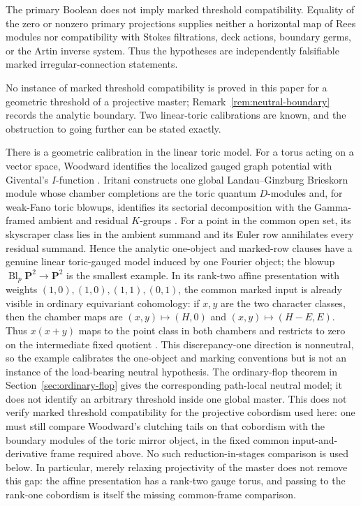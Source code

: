 The primary Boolean does not imply marked threshold compatibility.
Equality of the zero or nonzero primary projections supplies neither a
horizontal map of Rees modules nor compatibility with Stokes filtrations,
deck actions, boundary germs, or the Artin inverse system.  Thus the
hypotheses are independently falsifiable marked irregular-connection
statements.

\begin{remark}
\label{rem:verification-status}
No instance of marked threshold compatibility is proved in this paper for a
geometric threshold of a projective master;
Remark~\ref{rem:neutral-boundary} records the analytic boundary.  Two
linear-toric calibrations are known, and the obstruction to going further
can be stated exactly.

There is a geometric calibration in the linear toric model.  For a torus
acting on a vector space, Woodward identifies the localized gauged graph
potential with Givental's \(I\)-function
\cite[Example~9.15]{WoodwardQKIII}.  Iritani constructs one global
Landau--Ginzburg Brieskorn module whose chamber completions are the toric
quantum \(D\)-modules and, for weak-Fano toric blowups, identifies its
sectorial decomposition with the Gamma-framed ambient and residual
\(K\)-groups \cite[Theorems~1.3, 7.25, 7.31 and 7.33]{IritaniToricGlobal}.
For a point in the common open set, its skyscraper class lies in the ambient
summand and its Euler row annihilates every residual summand.  Hence the
analytic one-object and marked-row clauses have a genuine linear toric-gauged
model induced by one Fourier object; the blowup
\(\operatorname{Bl}_{p}\mathbf P^2\to\mathbf P^2\) is the smallest example.
In its rank-two affine presentation with weights
\((1,0),(1,0),(1,1),(0,1)\), the common marked input is already visible in
ordinary equivariant cohomology: if \(x,y\) are the two character classes,
then the chamber maps are \((x,y)\mapsto(H,0)\) and
\((x,y)\mapsto(H-E,E)\).  Thus \(x(x+y)\) maps to the point class in both
chambers and restricts to zero on the intermediate fixed quotient
\cite[Example~5.23]{WoodwardQKII}.
This discrepancy-one direction is nonneutral, so the example calibrates the
one-object and marking conventions but is not an instance of the
load-bearing neutral hypothesis.  The ordinary-flop theorem in
Section~\ref{sec:ordinary-flop} gives the corresponding path-local neutral
model; it does not identify an arbitrary threshold inside one global master.
This does not verify marked threshold compatibility for the projective
cobordism used here: one must still compare Woodward's clutching tails on
that cobordism with the boundary modules of the toric mirror object, in the
fixed common input-and-derivative frame required above.  No such
reduction-in-stages comparison is used below.  In particular, merely
relaxing projectivity of the master does not remove this gap: the affine
presentation has a rank-two gauge torus, and passing to the rank-one
cobordism is itself the missing common-frame comparison.


\end{remark}
